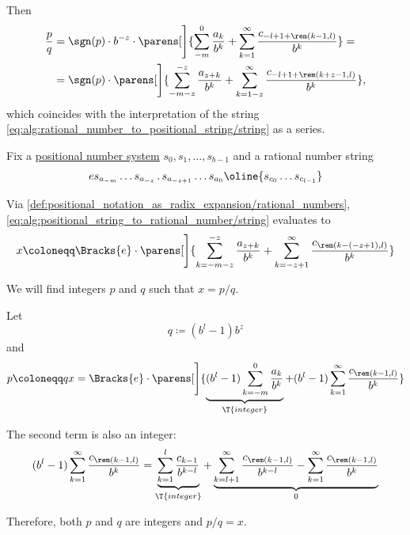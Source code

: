 \begin{defproof}
  Then
  \begin{align*}
    \frac p q
    &=
    \sgn(p) \cdot b^{-z} \cdot \parens[\Bigg]{ \sum_{-m}^0 \frac {a_k} {b^k} + \sum_{k=1}^\infty \frac {c_{-l+1+\rem(k-1, l)}} {b^k} }
    = \\ &=
    \sgn(p) \cdot \parens[\Bigg]{ \sum_{-m-z}^{-z} \frac {a_{z+k}} {b^k} + \sum_{k=1-z}^\infty \frac {c_{-l+1+\rem(k+z-1, l)}} {b^k} },
  \end{align*}
  which coincides with the interpretation of the string \eqref{eq:alg:rational_number_to_positional_string/string} as a series.
\end{defproof}

\begin{algorithm}\label{alg:positional_string_to_rational_number}
  Fix a \hyperref[def:positional_number_system]{positional number system} \( s_0, s_1, \ldots, s_{b-1} \) and a rational number string
  \begin{equation}\label{eq:alg:positional_string_to_rational_number/string}
    e s_{a_{-m}} \ldots s_{a_{-z}} \thinspace . \thinspace s_{a_{-z+1}} \ldots s_{a_0} \oline{s_{c_0} \ldots s_{c_{l-1}}}
  \end{equation}

  Via \cref{def:positional_notation_as_radix_expansion/rational_numbers}, \eqref{eq:alg:positional_string_to_rational_number/string} evaluates to
  \begin{equation*}
    x \coloneqq \Bracks{e} \cdot \parens[\Bigg]{ \sum_{k=-m-z}^{-z} \frac {a_{z+k}} {b^k} + \sum_{k=-z + 1}^\infty \frac {c_{\rem(k - (-z + 1), l)}} {b^k} }
  \end{equation*}

  We will find integers \( p \) and \( q \) such that \( x = p / q \).

  Let
  \begin{equation}\label{alg:positional_string_to_rational_number/q}
    q \coloneqq (b^l - 1) b^z
  \end{equation}
  and
  \begin{equation*}
    p \coloneqq qx = \Bracks{e} \cdot \parens[\Bigg]{ \underbrace{(b^l - 1) \sum_{k=-m}^0 \frac {a_k} {b^k}}_{\T{integer}} + (b^l - 1) \sum_{k=1}^\infty \frac {c_{\rem(k - 1, l)}} {b^k} }
  \end{equation*}

  The second term is also an integer:
  \begin{equation*}
    (b^l - 1) \sum_{k=1}^\infty \frac {c_{\rem(k - 1, l)}} {b^k}
    =
    \underbrace{\sum_{k=1}^l \frac {c_{k - 1}} {b^{k-l}}}_{\T{integer}} + \underbrace{\sum_{k=l + 1}^\infty \frac {c_{\rem(k - 1, l)}} {b^{k-l}} - \sum_{k=1}^\infty \frac {c_{\rem(k - 1, l)}} {b^k}}_0
  \end{equation*}

  Therefore, both \( p \) and \( q \) are integers and \( p / q = x \).
\end{algorithm}
